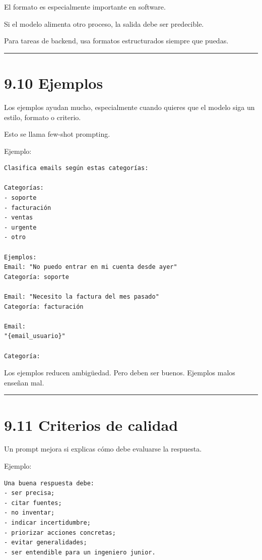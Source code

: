 El formato es especialmente importante en software.

Si el modelo alimenta otro proceso, la salida debe ser predecible.

Para tareas de backend, usa formatos estructurados siempre que puedas.

\begin{center}\rule{0.5\linewidth}{0.5pt}\end{center}

\section{9.10 Ejemplos}\label{ejemplos}

Los ejemplos ayudan mucho, especialmente cuando quieres que el modelo
siga un estilo, formato o criterio.

Esto se llama few-shot prompting.

Ejemplo:

\begin{lstlisting}
Clasifica emails según estas categorías:

Categorías:
- soporte
- facturación
- ventas
- urgente
- otro

Ejemplos:
Email: "No puedo entrar en mi cuenta desde ayer"
Categoría: soporte

Email: "Necesito la factura del mes pasado"
Categoría: facturación

Email:
"{email_usuario}"

Categoría:
\end{lstlisting}

Los ejemplos reducen ambigüedad. Pero deben ser buenos. Ejemplos malos
enseñan mal.

\begin{center}\rule{0.5\linewidth}{0.5pt}\end{center}

\section{9.11 Criterios de calidad}\label{criterios-de-calidad}

Un prompt mejora si explicas cómo debe evaluarse la respuesta.

Ejemplo:

\begin{lstlisting}
Una buena respuesta debe:
- ser precisa;
- citar fuentes;
- no inventar;
- indicar incertidumbre;
- priorizar acciones concretas;
- evitar generalidades;
- ser entendible para un ingeniero junior.
\end{lstlisting}

